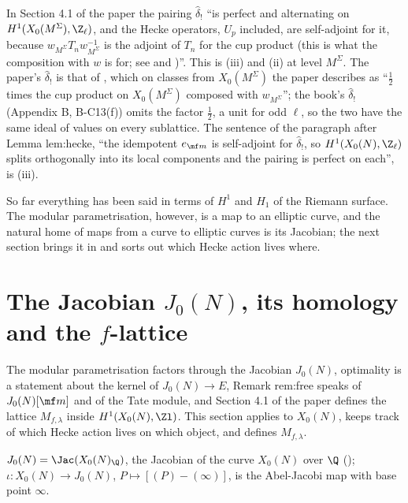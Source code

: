 \begin{paperlink}\label{pl:moddeg:delta-hat}
In Section 4.1 of the paper the pairing $\hat\delta_!$ ``is perfect and alternating on $H^1(X_0(M^\Sigma),\Z_\ell)$, and the Hecke operators, $U_p$ included, are self-adjoint for it,
because $w_{M^\Sigma}T_nw_{M^\Sigma}^{-1}$ is the adjoint of $T_n$ for the cup product (this is what the composition with $w$ is for; see \cite[\S\S1.6.1, 1.8.2]{DFG04} and \cite[\S4.4]{DDT})''.
This is (iii) and (ii) at level $M^\Sigma$. The paper's $\hat\delta_!$ is that of \cite{DFG04}, which on classes from
$X_0(M^\Sigma)$ the paper describes as ``$\frac12$ times the cup product on $X_0(M^\Sigma)$ composed with $w_{M^\Sigma}$''; the book's $\hat\delta_!$ (Appendix B, B-C13(f)) omits
the factor $\frac12$, a unit for odd $\ell$, so the two have the same ideal of values on every sublattice. The sentence of the paragraph after Lemma lem:hecke, ``the
idempotent $e_{\mf m}$ is self-adjoint for $\hat\delta_!$, so $H^1(X_0(N),\Z_\ell)$ splits orthogonally into its local components and the pairing is perfect on each'', is
(iii).
\end{paperlink}

So far everything has been said in terms of $H^1$ and $H_1$ of the Riemann surface. The modular parametrisation, however, is a map to an elliptic curve, and the
natural home of maps from a curve to elliptic curves is its Jacobian; the next section brings it in and sorts out which Hecke action lives where.

\section{The Jacobian \texorpdfstring{$J_0(N)$}{J0(N)}, its homology and the \texorpdfstring{$f$}{f}-lattice}\label{sec:moddeg:jacobian}

The modular parametrisation factors through the Jacobian $J_0(N)$, optimality is a statement about the kernel of $J_0(N)\to E$, Remark rem:free speaks of $J_0(N)[\mf m]$
and of the Tate module, and Section 4.1 of the paper defines the lattice $M_{f,\lambda}$ inside $H^1(X_0(N),\Zl)$. This section applies  to $X_0(N)$, keeps
track of which Hecke action lives on which object, and defines $M_{f,\lambda}$.

\begin{definition}[$J_0(N)$]\label{def:moddeg:j0}
$J_0(N)=\Jac(X_0(N)_\Q)$, the Jacobian of the curve $X_0(N)$ over $\Q$ (); $\iota\colon X_0(N)\to J_0(N)$, $P\mapsto[(P)-(\infty)]$, is the Abel-Jacobi map with base
point $\infty$.
\end{definition}

